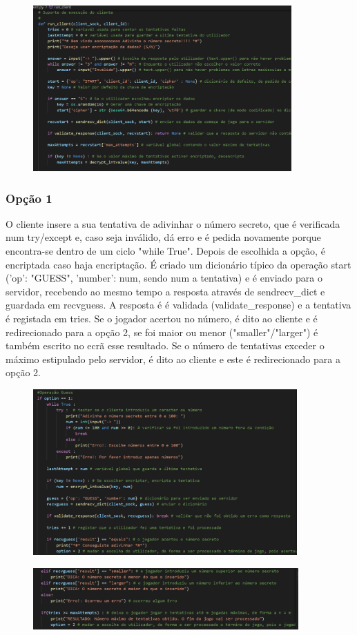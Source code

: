 \documentclass{report}
\begin{document}
 \begin{figure}[!h]
\center
\includegraphics[height = 180pt]{img/run1.png}
\end{figure}

\subsubsection{Opção 1}
\label{sssec:first}

O cliente insere a sua tentativa de adivinhar o número secreto, que é verificada num try/except e, caso seja inválido, dá
erro e é pedida novamente porque encontra-se dentro de um ciclo "while True". Depois de escolhida a opção, é encriptada
caso haja encriptação. É criado um dicionário típico da operação start ({'op': "GUESS", 'number': num}, sendo num a tentativa)
e é enviado para o servidor, recebendo ao mesmo tempo a resposta através de sendrecv\_dict e guardada em recvguess. A resposta é
é validada (validate\_response) e a tentativa é registada em tries. Se o jogador acertou no número, é dito ao cliente e é redirecionado
para a opção 2, se foi maior ou menor ("smaller"/"larger") é também escrito no ecrã esse resultado. Se o número de tentativas
exceder o máximo estipulado pelo servidor, é dito ao cliente e este é redirecionado para a opção 2.

\begin{figure}[!h]
\center
\includegraphics[height = 180pt]{img/option1.png}
\end{figure}
\begin{figure}[!h]
\center
\includegraphics[height = 67pt]{img/opt1sec.png}
\end{figure}
\end{document}
